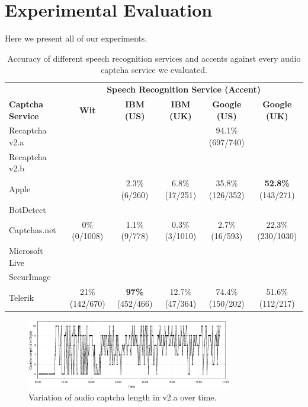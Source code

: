 \section{Experimental Evaluation}
\label{sec:evaluation}

Here we present all of our experiments.

\begin{table}[t]
\centering
\caption{Accuracy of different speech recognition services and accents against every audio captcha service we evaluated.}
\begin{tabular}{lccccc}
\toprule
&\multicolumn{5}{c}{\textbf{Speech Recognition Service (Accent)}}\\
\cmidrule{2-6}
\textbf{Captcha Service}& \textbf{Wit}& \textbf{IBM (US)} & \textbf{ IBM (UK)} & \textbf{Google (US)} & \textbf{Google (UK)} \\
\hline
Recaptcha v2.a &  &  & & 94.1\% (697/740) & \\
\rowcolor{Gray}
Recaptcha v2.b &  &  &  &  & \\
Apple  &  & 2.3\% (6/260) & 6.8\% (17/251) & 35.8\% (126/352) & \textbf{52.8\%} (143/271) \\
\rowcolor{Gray}
BotDetect  &  & &  & & \\
Captchas.net  & 0\% (0/1008) & 1.1\% (9/778)  & 0.3\% (3/1010)  & 2.7\% (16/593) & 22.3\% (230/1030) \\
\rowcolor{Gray}
Microsoft Live & &  &  & & \\
SecurImage  &  & &  & & \\
\rowcolor{Gray}
Telerik  & 21\% (142/670)  & \textbf{97\%} (452/466) & 12.7\% (47/364) & 74.4\% (150/202) & 51.6\% (112/217) \\
\bottomrule
\end{tabular}
\label{tab:combinations}
\end{table}



\begin{figure}
\centering
\includegraphics[width=0.8\textwidth]{figures/captcha_length.eps}
\caption{Variation of audio captcha length in \re v2.a over time.}
\label{fig:length}
\end{figure}

